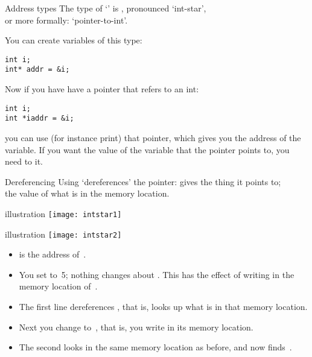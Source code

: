 \begin{block}{Address types}
  \label{sl:intstar}
  The type of `' is , pronounced `int-star',\\
  or more
  formally: `pointer-to-int'.

  You can create variables of this type:
\begin{lstlisting}
int i;
int* addr = &i;
\end{lstlisting}
\end{block}

Now if you have have a pointer that refers to an int:
\begin{lstlisting}
int i;
int *iaddr = &i;
\end{lstlisting}
you can use (for instance print) that pointer, which gives you the
address of the variable. If you want the value of the variable that
the pointer points to, you need to  it.

\begin{block}{Dereferencing}
  \label{sl:starderef}
  Using  `dereferences' the pointer: gives the thing it
  points to;\\
  the value of what
  is in the memory location.
\end{block}

\begin{block}{illustration}
  \label{sl:copy-pic}
  \texttt{[image: intstar1]}
\end{block}

\begin{block}{illustration}
  \label{sl:deref-pic}
  \texttt{[image: intstar2]}
\end{block}

\begin{itemize}
\item {} is the address of~.
\item You set  to~5; nothing changes about . This has the
  effect of writing  in the memory location of~.
\item The first  line dereferences , that is, looks up
  what is in that memory location.
\item Next you change  to~, that is, you write  in its
  memory location.
\item The second  looks in the same memory location as before,
  and now finds~.
\end{itemize}

